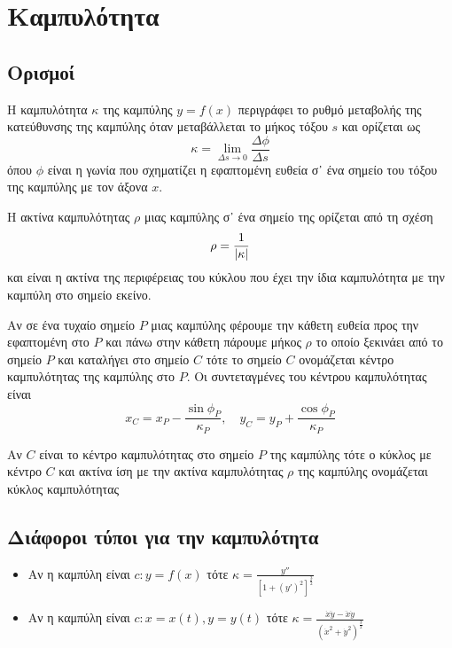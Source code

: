 



\everymath{\displaystyle}





\chapter{Καμπυλότητα}

\section{Ορισμοί}


\begin{dfn}
  Η \textcolor{Col2}{καμπυλότητα $\kappa$} της καμπύλης $ y = f(x) $ περιγράφει
  το ρυθμό μεταβολής της κατεύθυνσης της καμπύλης όταν μεταβάλλεται το μήκος
  τόξου $s$ και ορίζεται ως 
  \[
    \kappa = \lim_{\Delta s\to 0} \frac{\Delta \phi}{\Delta s} 
  \] 
  όπου $\phi$ είναι η γωνία που σχηματίζει η εφαπτομένη ευθεία σ᾽ ένα σημείο
  του τόξου της καμπύλης με τον άξονα $x$. 
\end{dfn}

\begin{dfn}
  Η \textcolor{Col2}{ακτίνα καμπυλότητας $\rho$} μιας καμπύλης σ᾽ ένα σημείο
  της ορίζεται από τη σχέση 
  \[
    \rho = \frac{1}{\abs{\kappa}} 
  \] 
  και είναι η ακτίνα της περιφέρειας του κύκλου που έχει την ίδια καμπυλότητα
  με την καμπύλη στο σημείο εκείνο.
\end{dfn}

\begin{dfn}
  Αν σε ένα τυχαίο σημείο $P$ μιας καμπύλης φέρουμε την κάθετη ευθεία  προς την
  εφαπτομένη στο $P$ και πάνω στην κάθετη πάρουμε μήκος $\rho$ το οποίο
  ξεκινάει από το σημείο $P$ και καταλήγει στο σημείο $C$ τότε το σημείο $C$
  ονομάζεται \textcolor{Col2}{κέντρο καμπυλότητας} της καμπύλης στο $P$.
  Οι συντεταγμένες του κέντρου καμπυλότητας είναι
  \[
    x_{C} = x_{P} - \frac{\sin{\phi_{P}}}{\kappa_{P}}, \quad y_{C} = y_{P} +
    \frac{\cos{\phi_{P}}}{\kappa_{P}} 
  \] 
\end{dfn}

\begin{dfn}
  Αν $C$ είναι το κέντρο καμπυλότητας στο σημείο $P$ της καμπύλης τότε ο
  κύκλος με κέντρο $C$ και ακτίνα ίση με την ακτίνα καμπυλότητας $\rho$ της
  καμπύλης ονομάζεται \textcolor{Col2}{κύκλος καμπυλότητας}
\end{dfn}

\section{Διάφοροι τύποι για την καμπυλότητα}

\begin{itemize}
  \item Αν η καμπύλη είναι $c: y = f(x) $ τότε $ \kappa = \frac{y''}{[1 + (y')^{2}]
    ^{\frac{3}{2}}} $
  \item Αν η καμπύλη είναι $ c: x = x(t), y = y(t) $ τότε $ \kappa =
    \frac{\dot{x}\ddot{y} - \ddot{x}\dot{y}}{(\dot{x}^{2} +
    \dot{y}^{2})^{\frac{3}{2}}}$
\end{itemize}




